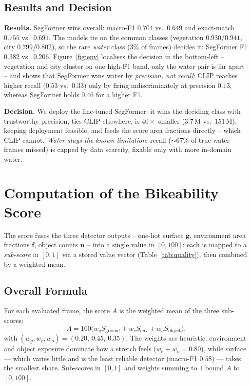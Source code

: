 \documentclass[letterpaper,journal]{IEEEtran}
\begin{document}
\subsection{Results and Decision}
\textbf{Results.} SegFormer wins overall: macro-F1 $0.704$ vs.\ $0.649$ and exact-match
$0.755$ vs.\ $0.691$. The models tie on the common classes (vegetation
$0.930$/$0.941$, city $0.799$/$0.802$), so the rare \emph{water} class ($3\%$ of
frames) decides it: SegFormer F1 $0.382$ vs.\ $0.206$. Figure~\ref{fig:env} localises
the decision in the bottom-left -- vegetation and city cluster on one high-F1 band,
only the water pair is far apart -- and shows that SegFormer wins water by
\emph{precision, not recall}: CLIP reaches higher recall ($0.53$ vs.\ $0.33$) only by
firing indiscriminately at precision $0.13$, whereas SegFormer holds $0.46$ for a
higher F1.

\textbf{Decision.} We deploy the fine-tuned SegFormer: it wins the deciding class with
trustworthy precision, ties CLIP elsewhere, is $40\times$ smaller ($3.7$\,M vs.\
$151$\,M), keeping deployment feasible, and feeds the score area fractions
directly -- which CLIP cannot.
\emph{Water stays the known limitation}: recall (${\sim}67\%$ of true-water frames
missed) is capped by data scarcity, fixable only with more in-domain water.

\setlength{\intextsep}{3pt}%


\clearpage
\section{Computation of the Bikeability Score}
\label{sec:score}

The score fuses the three detector outputs -- one-hot surface $\mathbf{g}$,
environment area fractions $\mathbf{f}$, object counts $\mathbf{n}$ -- into a single
value in $[0,100]$: each is mapped to a \emph{sub-score} in $[0,1]$ via a stored
value vector (Table~\ref{tab:quality}), then combined by a weighted mean.

\subsection{Overall Formula}
For each evaluated frame, the score $A$ is the weighted mean of the three sub-scores:
\begin{equation}
\label{eq:weights}
A = 100 \big( w_g S_{\text{ground}} + w_e S_{\text{env}} + w_o S_{\text{object}} \big),
\end{equation}
with $(w_g,w_e,w_o) = (0.20,\,0.45,\,0.35)$. The weights are heuristic: environment
and object exposure dominate how a stretch feels ($w_e+w_o=0.80$), while surface ---
which varies little and is the least reliable detector (macro-F1 $0.58$) --- takes the
smallest share. Sub-scores in $[0,1]$ and weights summing to $1$ bound $A$ to
$[0,100]$.
\end{document}
